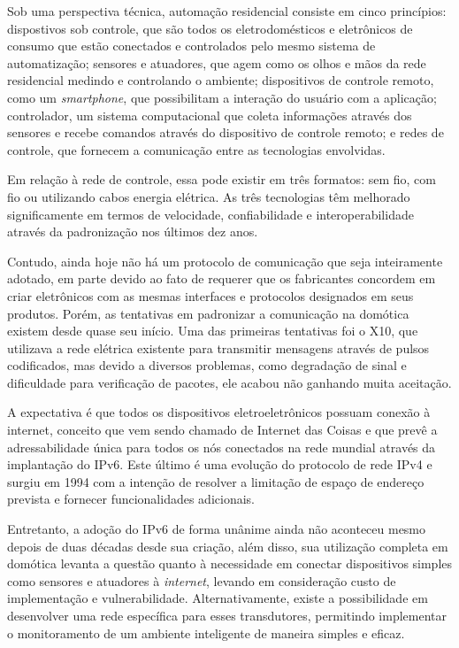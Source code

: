 \documentclass[
    12pt,               %
    a4paper,            %
    english,            %
    brazil,             %
    ]{article}
\begin{document}
Sob uma perspectiva técnica, automação residencial consiste em cinco princípios: dispostivos sob controle, que são todos os
eletrodomésticos e eletrônicos de consumo que estão conectados e controlados pelo mesmo sistema de automatização; sensores e
atuadores, que agem como os olhos e mãos da rede residencial medindo e controlando o ambiente; dispositivos de controle remoto,
como um \textit{smartphone}, que possibilitam a interação do usuário com a aplicação; controlador, um sistema computacional que
coleta informações através dos sensores e recebe comandos através do dispositivo de controle remoto; e redes de controle, que
fornecem a comunicação entre as tecnologias envolvidas. \cite{kyas2013}

Em relação à rede de controle, essa pode existir em três formatos: sem fio, com fio ou utilizando cabos energia elétrica. As três
tecnologias têm melhorado significamente em termos de velocidade, confiabilidade e interoperabilidade através da padronização nos
últimos dez anos. \cite{kyas2013}

Contudo, ainda hoje não há um protocolo de comunicação que seja inteiramente adotado, em parte devido ao fato de requerer que
os fabricantes concordem em criar eletrônicos com as mesmas interfaces e protocolos designados em seus produtos. Porém, as
tentativas em padronizar a comunicação na domótica existem desde quase seu início. Uma das primeiras tentativas foi o X10, que
utilizava a rede elétrica existente para transmitir mensagens através de pulsos codificados, mas devido a diversos problemas, como
degradação de sinal e dificuldade para verificação de pacotes, ele acabou não ganhando muita aceitação. \cite{riley2012}

A expectativa é que todos os dispositivos eletroeletrônicos possuam conexão à internet, conceito que vem sendo chamado de Internet
das Coisas e que prevê a adressabilidade única para todos os nós conectados na rede mundial através da implantação do IPv6. Este
último é uma evolução do protocolo de rede IPv4 e surgiu em 1994 com a intenção de resolver a limitação de espaço de endereço
prevista e fornecer funcionalidades adicionais. \cite{hagen2002}

Entretanto, a adoção do IPv6 de forma unânime ainda não aconteceu mesmo depois de duas décadas desde sua criação, além disso, sua
utilização completa em domótica levanta a questão quanto à necessidade em conectar dispositivos simples como sensores e atuadores
à \textit{internet}, levando em consideração custo de implementação e vulnerabilidade. Alternativamente, existe a possibilidade em
desenvolver uma rede específica para esses transdutores, permitindo implementar o monitoramento de um ambiente inteligente de
maneira simples e eficaz.
\end{document}
